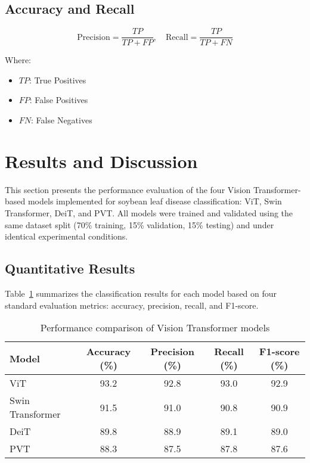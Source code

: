 \documentclass[preprint,12pt]{elsarticle}
\begin{document}
\subsection{Accuracy and Recall}

\begin{equation}
\text{Precision} = \frac{TP}{TP + FP}, \quad \text{Recall} = \frac{TP}{TP + FN}
\label{eq:precision-recall}
\end{equation}

Where:
\begin{itemize}
  \item \( TP \): True Positives
  \item \( FP \): False Positives
  \item \( FN \): False Negatives
\end{itemize}

\section{Results and Discussion}

This section presents the performance evaluation of the four Vision Transformer-based models implemented for soybean leaf disease classification: ViT, Swin Transformer, DeiT, and PVT. All models were trained and validated using the same dataset split (70\% training, 15\% validation, 15\% testing) and under identical experimental conditions.

\subsection{Quantitative Results}

Table~\ref{tab:performance} summarizes the classification results for each model based on four standard evaluation metrics: accuracy, precision, recall, and F1-score.

\begin{table}[H]
\centering
\caption{Performance comparison of Vision Transformer models}
\label{tab:performance}
\begin{tabular}{lcccc}
\hline
\textbf{Model} & \textbf{Accuracy (\%)} & \textbf{Precision (\%)} & \textbf{Recall (\%)} & \textbf{F1-score (\%)} \\
\hline
ViT              & 93.2 & 92.8 & 93.0 & 92.9 \\
Swin Transformer & 91.5 & 91.0 & 90.8 & 90.9 \\
DeiT             & 89.8 & 88.9 & 89.1 & 89.0 \\
PVT              & 88.3 & 87.5 & 87.8 & 87.6 \\
\hline
\end{tabular}
\end{table}
\end{document}
